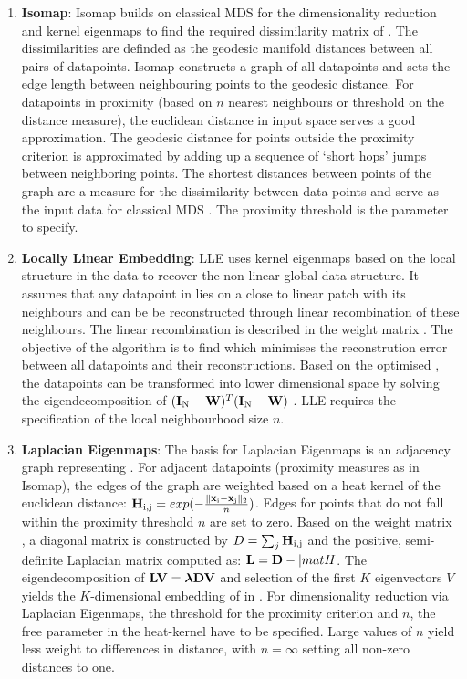 \begin{enumerate}
\item\textbf{Isomap}: Isomap builds on classical MDS for the dimensionality reduction and kernel eigenmaps to find the required dissimilarity matrix of . The dissimilarities are definded as the geodesic manifold distances between all pairs of datapoints. Isomap constructs a graph of all datapoints and sets the edge length between neighbouring points to the geodesic distance. For datapoints in proximity (based on \(n\) nearest neighbours or threshold on the distance measure), the euclidean distance in input space serves a good approximation. The geodesic distance for points outside the proximity criterion is approximated by adding up a sequence of `short hops' jumps  between neighboring points. The shortest distances between points of the graph are a measure for the dissimilarity between data points and serve as the input data for classical MDS \citep{Tenebaum2000}. The proximity threshold is the parameter to specify. 

\item\textbf{Locally Linear Embedding}: LLE uses kernel eigenmaps based on the local structure in the data to recover the non-linear global data structure. It assumes that any datapoint in  lies on a close to linear patch with its neighbours and can be be reconstructed through linear recombination of these neighbours. The linear recombination is described in the weight matrix . The objective of the algorithm is to find  which minimises the reconstrution error between all datapoints and their reconstructions. Based on the optimised , the datapoints  can be transformed into lower dimensional space  by solving the eigendecomposition of \((\boldsymbol{\mathbf{I}}_\text{N} -\boldsymbol{\mathbf{W}})^T(\boldsymbol{\mathbf{I}}_\text{N} -\boldsymbol{\mathbf{W}})\) \citep{Roweis2000}. LLE requires the specification of the local neighbourhood size \(n\). 

\item\textbf{Laplacian Eigenmaps}: The basis for Laplacian Eigenmaps is an adjacency graph representing . For adjacent datapoints (proximity measures as in Isomap), the edges of the graph are weighted based on a heat kernel of the euclidean distance: \(\boldsymbol{\mathbf{H}}_\text{i,j}=exp(-\frac{\lVert \boldsymbol{\mathbf{x}}_\text{i} - \boldsymbol{\mathbf{x}}_\text{j}\rVert_2}{n})\). Edges for points that do not fall within the proximity threshold \(n\) are set to zero.  Based on the weight matrix , a diagonal matrix  is constructed by \(D = \sum_{j} \boldsymbol{\mathbf{H}}_\text{i,j}\) and the positive, semi-definite Laplacian matrix  computed as: \(\boldsymbol{\mathbf{L}} = \boldsymbol{\mathbf{D}} - |mat{H}\). The eigendecomposition of \(\boldsymbol{\mathbf{LV}} = \boldsymbol{\mathbf{\lambda DV}}\) and selection of the first \(K\) eigenvectors \(V\) yields the \(K\)-dimensional embedding of  in  \citep{Belkin2003}. For dimensionality reduction via Laplacian Eigenmaps, the threshold for the proximity criterion and \(n\), the free parameter in the heat-kernel have to be specified. Large values of \(n\) yield less weight to differences in distance, with \(n=\infty\) setting all non-zero distances to one. 
 

\end{enumerate}
